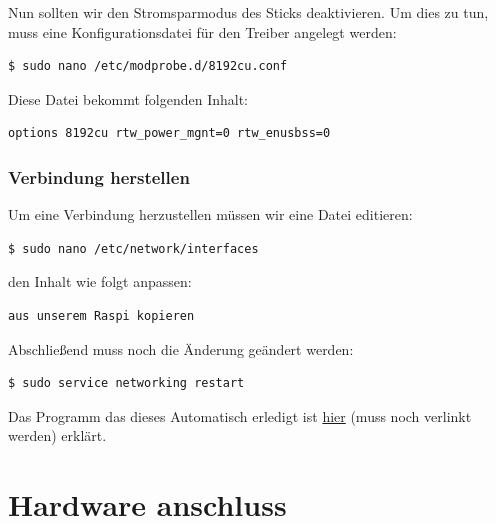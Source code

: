 \documentclass[4paper,0pt]{article}
\begin{document}
Nun sollten wir den Stromsparmodus des Sticks deaktivieren. Um dies zu tun, muss eine Konfigurationsdatei für den Treiber angelegt werden:

\begin{shaded}
\begin{lstlisting}
$ sudo nano /etc/modprobe.d/8192cu.conf
\end{lstlisting}
\end{shaded}

Diese Datei bekommt folgenden Inhalt:

\begin{shaded}
\begin{lstlisting}
options 8192cu rtw_power_mgnt=0 rtw_enusbss=0
\end{lstlisting}
\end{shaded}

\subsubsection{Verbindung herstellen}

Um eine Verbindung herzustellen müssen wir eine Datei editieren:

\begin{shaded}
\begin{lstlisting}
$ sudo nano /etc/network/interfaces
\end{lstlisting}
\end{shaded}

den Inhalt wie folgt anpassen:

\begin{shaded}
\begin{lstlisting}
aus unserem Raspi kopieren
\end{lstlisting}
\end{shaded}

Abschließend muss noch die Änderung geändert werden:

\begin{shaded}
\begin{lstlisting}
$ sudo service networking restart
\end{lstlisting}
\end{shaded}

Das Programm das dieses Automatisch erledigt ist \hyperlink{target}{hier} (muss noch verlinkt werden) erklärt. 

\section{Hardware anschluss}
\end{document}
